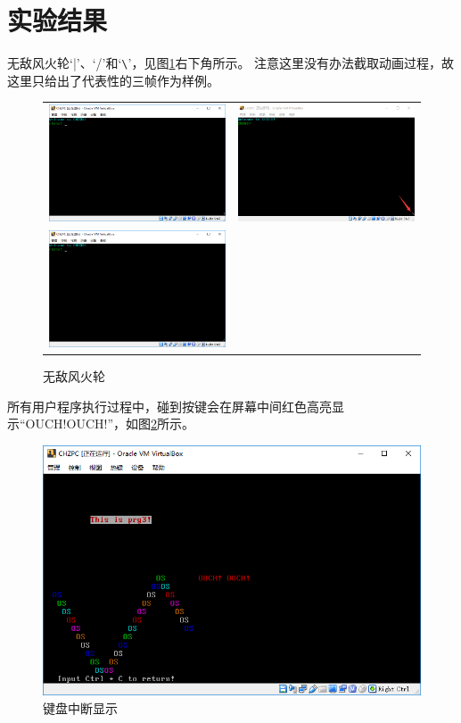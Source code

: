 \documentclass[logo,reportComp]{thesis}
\begin{document}
\section{实验结果}
无敌风火轮`|'、`/'和`\verb'\''，见图\ref{fig:wheel}右下角所示。
注意这里没有办法截取动画过程，故这里只给出了代表性的三帧作为样例。
\begin{figure}[H]
\centering
\begin{tabular}{cc}
\includegraphics[width=0.5\linewidth]{fig/wheel_1.PNG}&
\includegraphics[width=0.5\linewidth]{fig/wheel_2.PNG}\\
\includegraphics[width=0.5\linewidth]{fig/wheel_3.PNG}&
\end{tabular}
\caption{无敌风火轮}
\label{fig:wheel}
\end{figure}

所有用户程序执行过程中，碰到按键会在屏幕中间红色高亮显示``OUCH!OUCH!''，如图\ref{fig:ouch}所示。
\begin{figure}[H]
\centering
\includegraphics[width=0.8\linewidth]{fig/ouch.PNG}
\caption{键盘中断显示}
\label{fig:ouch}
\end{figure}
\end{document}
